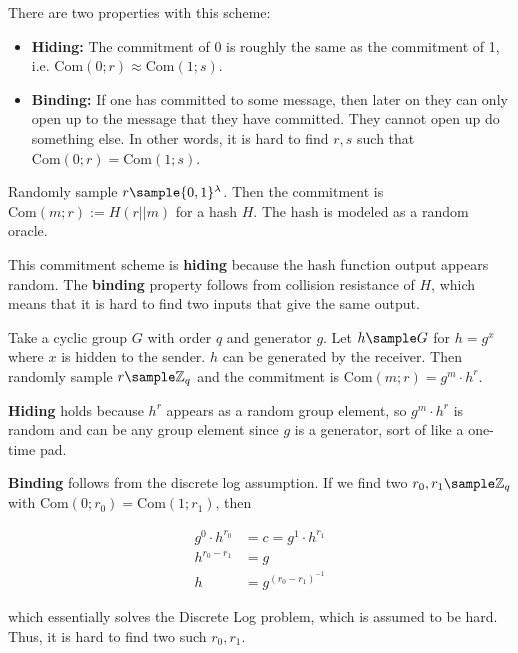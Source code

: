 There are two properties with this scheme:
\begin{itemize}
    \item \textbf{Hiding:} The commitment of 0 is roughly the same as the commitment of 1, i.e. $\text{Com}(0; r) \approx \text{Com}(1; s)$.
    \item \textbf{Binding:} If one has committed to some message, then later on they can only open up to the message that they have committed. They cannot open up do something else. In other words, it is hard to find $r, s$ such that $\text{Com}(0;r) = \text{Com}(1;s)$.
\end{itemize}

\begin{example}
Randomly sample $r \sample \{0, 1\}^\lambda$. Then the commitment is $\text{Com}(m;r) := H(r || m)$ for a hash $H$. The hash is modeled as a random oracle.

This commitment scheme is \textbf{hiding} because the hash function output appears random. The \textbf{binding} property follows from collision resistance of $H$, which means that it is hard to find two inputs that give the same output.

\end{example}

\begin{example}
Take a cyclic group $G$ with order $q$ and generator $g$. Let $h \sample G$ for $h = g^x$ where $x$ is hidden to the sender. $h$ can be generated by the receiver. Then randomly sample $r \sample \ZZ_q$ and the commitment is $\text{Com}(m;r) = g^m \cdot h^r.$

\textbf{Hiding} holds because $h^r$ appears as a random group element, so $g^m \cdot h^r$ is random and can be any group element since $g$ is a generator, sort of like a one-time pad.

\textbf{Binding} follows from the discrete log assumption. If we find two $r_0, r_1 \sample \ZZ_q$ with $\text{Com}(0;r_0) = \text{Com}(1;r_1)$, then

\begin{align*}
    g^0 \cdot h^{r_0} &= c = g^1 \cdot h^{r_1}\\
    h ^{r_0 - r_1} &= g\\
    h &= g^{(r_0 - r_1)^{-1}}
\end{align*}

which essentially solves the Discrete Log problem, which is assumed to be hard. Thus, it is hard to find two such $r_0, r_1$.

\end{example}

